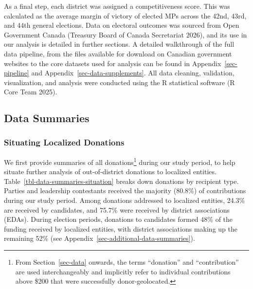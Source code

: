 \documentclass[
  letterpaper,
  DIV=11,
  numbers=noendperiod]{scrartcl}
\begin{document}
As a final step, each district was assigned a competitiveness score.
This was calculated as the average margin of victory of elected MPs
across the 42nd, 43rd, and 44th general elections. Data on electoral
outcomes was sourced from Open Government Canada (Treasury Board of
Canada Secretariat 2026), and its use in our analysis is detailed in
further sections. A detailed walkthrough of the full data pipeline, from
the files available for download on Canadian government websites to the
core datasets used for analysis can be found in
Appendix~\ref{sec-pipeline} and Appendix~\ref{sec-data-supplements}. All
data cleaning, validation, visualization, and analysis were conducted
using the R statistical software (R Core Team 2025).

\subsection{Data Summaries}\label{sec-data-summaries}

\subsubsection{Situating Localized
Donations}\label{sec-data-summaries-situation}

We first provide summaries of all donations\footnote{From
  Section~\ref{sec-data} onwards, the terms ``donation'' and
  ``contribution'' are used interchangeably and implicitly refer to
  individual contributions above \$200 that were successfully
  donor-geolocated.} during our study period, to help situate further
analysis of out-of-district donations to localized entities.
Table~\ref{tbl-data-summaries-situation} breaks down donations by
recipient type. Parties and leadership contestants received the majority
(80.8\%) of contributions during our study period. Among donations
addressed to localized entities, 24.3\% are received by candidates, and
75.7\% were received by district associations (EDAs). During election
periods, donations to candidates formed 48\% of the funding received by
localized entities, with district associations making up the remaining
52\% (see Appendix~\ref{sec-additional-data-summaries}).
\end{document}

